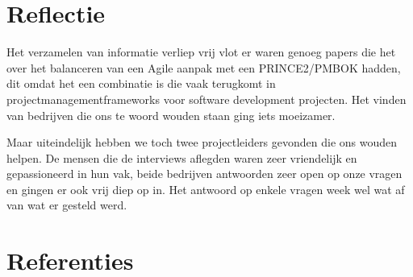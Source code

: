 \documentclass[dutch]{hogent-article}
\begin{document}
\section{Reflectie}
\label{sec:reflectie}
Het verzamelen van informatie verliep vrij vlot er waren genoeg papers die het over het balanceren van
een Agile aanpak met een PRINCE2/PMBOK hadden, dit omdat het een combinatie is die vaak terugkomt in
projectmanagementframeworks voor software development projecten. Het vinden van bedrijven die ons te woord wouden staan ging iets moeizamer.
\newline

Maar uiteindelijk hebben we toch twee projectleiders gevonden die ons wouden helpen. De mensen die de
interviews aflegden waren zeer vriendelijk en gepassioneerd in hun vak, beide bedrijven antwoorden zeer open op onze vragen en gingen er ook vrij diep op in.
Het antwoord op enkele vragen week wel wat af van wat er gesteld werd.

\section{Referenties}
\label{sec:Referenties}
\printbibliography[heading=none]
\end{document}
